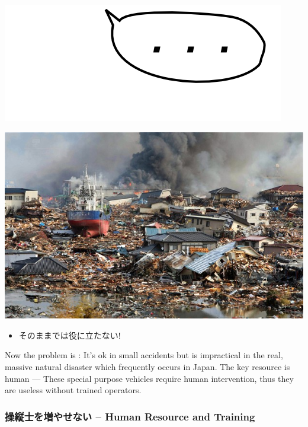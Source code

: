 \begin{container-fluid}
\begin{row-fluid}
\begin{span2}
\includegraphics{img/silent.png}
\end{span2}
\begin{span10}
\includegraphics{img/static/tsunami.jpg}
\end{span10}
\end{row-fluid}
\end{container-fluid}

\begin{larger}
\begin{alignright}
\begin{itemize}
\item そのままでは役に立たない!
\end{itemize}
\end{alignright}
\end{larger}

\begin{resume}
Now the problem is : It's ok in small accidents but is impractical in the real, massive 
natural disaster which frequently occurs in Japan.
The key resource is human ---
These special purpose vehicles require human intervention,
thus they are useless without trained operators.
\end{resume}

\subsubsection{操縦士を増やせない -- Human Resource and Training}
\label{sec-4-2-1}


